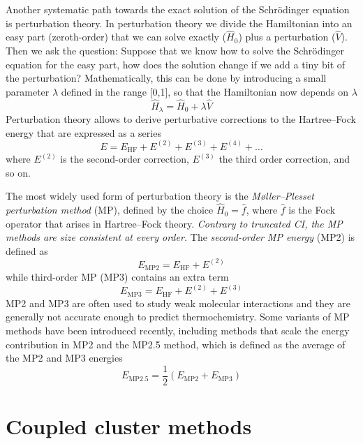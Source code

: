 \documentclass[../Main/notes.tex]{subfiles}
\begin{document}
Another systematic path towards the exact solution of the Schr\"{o}dinger equation is perturbation theory.
In perturbation theory we divide the Hamiltonian into an easy part (zeroth-order) that we can solve exactly ($\hat{H}_0$) plus a perturbation ($\hat{V}$).
Then we ask the question: Suppose that we know how to solve the Schr\"{o}dinger equation for the easy part, how does the solution change if we add a tiny bit of the perturbation?
Mathematically, this can be done by introducing a small parameter $\lambda$ defined in the range [0,1], so that the Hamiltonian now depends on $\lambda$
\begin{equation}
\hat{H}_\lambda = \hat{H}_0 + \lambda \hat{V}
\end{equation}
Perturbation theory allows to derive perturbative corrections to the Hartree--Fock energy that are expressed as a series
\begin{equation}
E = E_\text{HF} + E^{(2)} + E^{(3)} + E^{(4)} + \ldots
\end{equation}
where $E^{(2)}$ is the second-order correction, $E^{(3)}$ the third order correction, and so on.

The most widely used form of perturbation theory is the \emph{M{\o}ller--Plesset perturbation method} (MP), defined by the choice $\hat{H}_0 = \hat{f}$, where $\hat{f}$ is the Fock operator that arises in Hartree--Fock theory.
\emph{Contrary to truncated CI, the MP methods are size consistent at every order.}
The \emph{second-order MP energy} (MP2) is defined as
\begin{equation}
E_\text{MP2} = E_\text{HF} + E^{(2)}
\end{equation}
while third-order MP (MP3) contains an extra term
\begin{equation}
E_\text{MP3} = E_\text{HF} + E^{(2)} + E^{(3)}
\end{equation}
MP2 and MP3 are often used to study weak molecular interactions and they are generally not accurate enough to predict thermochemistry.
Some variants of MP methods have been introduced recently, including methods that scale the energy contribution in MP2 and the MP2.5 method, which is defined as the average of the MP2 and MP3 energies
\begin{equation}
E_\text{MP2.5} = \frac{1}{2} (E_\text{MP2} +E_\text{MP3})
\end{equation}


\section{Coupled cluster methods}
\end{document}
